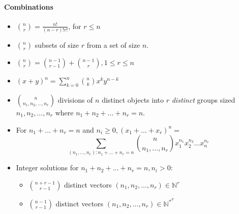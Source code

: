 \paragraph{Combinations}
\begin{itemize}
  \item $\binom{n}{r} = \frac{n!}{(n-r)!r!}$, for $ r\le n$
  \item \(\binom{n}{r}\) subsets of size \( r \) from a set of size \( n \).
  \item \(\binom{n}{r}=\binom{n-1}{r-1}+\binom{n-1}{r},1\le r\le n\)
  \item \( {(x + y)}^n = \sum_{k=0}^n \binom{n}{k}x^{k}y^{n-k} \)
  \item \(\binom{n}{n_1,n_2,…,n_r}\) divisions of \(n\) distinct objects into
    \(r\) \emph{distinct} groups sized \(n_1,n_2,…,n_r\) where \(n_1+n_2+…+n_r=n\).
  \item For $n_1+…+n_r=n$ and $n_i\ge0,{(x_1+…+x_r)}^n=$
    \[\sum_{(n_1,…,n_r):n_1+…+n_r=n}
    \binom{n}{n_1,…,n_r}x_1^{n_1}x_2^{n_2}…x_n^{n_r} \]
  \item Integer solutions for \(n_1+n_2+…+n_r=n, n_i>0\):
    \begin{itemize}
      \item \( \binom{n+r-1}{r-1} \) distinct vectors
        $(n_1,n_2,…,n_r)\in{\mathbb{N}}^r$
      \item \( \binom{n-1}{r-1} \) distinct vectors
        $(n_1,n_2,…,n_r)\in{\mathbb{N}^{*}}^r$
    \end{itemize}
\end{itemize}
